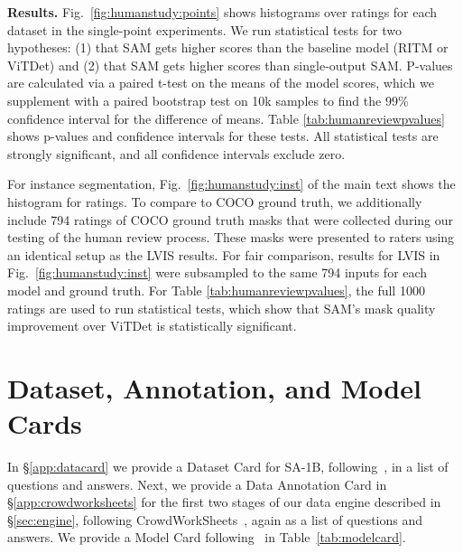 \documentclass[10pt,twocolumn,letterpaper]{article}
\renewcommand{\paragraph}[1]{\vspace{1.25mm}\noindent\textbf{#1}}
\newcommand{\sad}{\mbox{SA-1B}\xspace}
\newcommand{\sam}{SAM\xspace}
\newcommand{\fig}[1]{Fig.~\ref{#1}}
\begin{document}
\paragraph{Results.} \fig{fig:humanstudy:points} shows histograms over ratings for each dataset in the single-point experiments. We run statistical tests for two hypotheses: (1) that \sam gets higher scores than the baseline model (RITM or ViTDet) and (2) that \sam gets higher scores than single-output \sam. P-values are calculated via a paired t-test on the means of the model scores, which we supplement with a paired bootstrap test on 10k samples to find the 99\% confidence interval for the difference of means. Table \ref{tab:humanreviewpvalues} shows p-values and confidence intervals for these tests. All statistical tests are strongly significant, and all confidence intervals exclude zero.

For instance segmentation, \fig{fig:humanstudy:inst} of the main text shows the histogram for ratings. To compare to COCO ground truth, we additionally include 794 ratings of COCO ground truth masks that were collected during our testing of the human review process. These masks were presented to raters using an identical setup as the LVIS results. For fair comparison, results for LVIS in \fig{fig:humanstudy:inst} were subsampled to the same 794 inputs for each model and ground truth. For Table \ref{tab:humanreviewpvalues}, the full 1000 ratings are used to run statistical tests, which show that \sam's mask quality improvement over ViTDet is statistically significant.

\section{Dataset, Annotation, and Model Cards}\label{app:cards}

In \S\ref{app:datacard} we provide a Dataset Card for \sad, following~\cite{gebru2021datasheets}, in a list of questions and answers. Next, we provide a Data Annotation Card in \S\ref{app:crowdworksheets} for the first two stages of our data engine described in \S\ref{sec:engine}, following CrowdWorkSheets~\cite{diaz2022crowdworksheets}, again as a list of questions and answers. We provide a Model Card following~\cite{mitchell2019model} in Table~\ref{tab:modelcard}.
\end{document}
